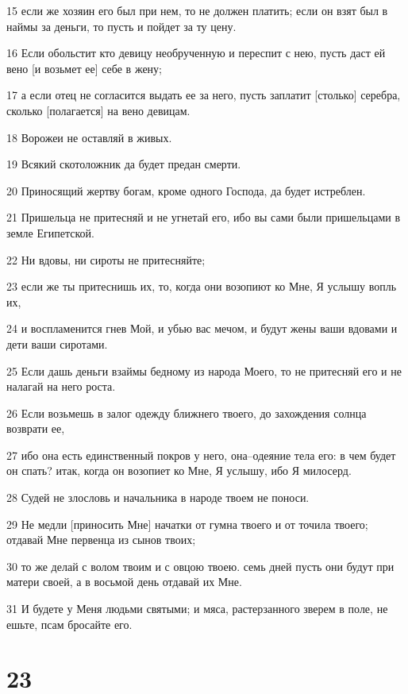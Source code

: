\par 15 если же хозяин его был при нем, то не должен платить; если он взят был в наймы за деньги, то пусть и пойдет за ту цену.
\par 16 Если обольстит кто девицу необрученную и переспит с нею, пусть даст ей вено [и возьмет ее] себе в жену;
\par 17 а если отец не согласится выдать ее за него, пусть заплатит [столько] серебра, сколько [полагается] на вено девицам.
\par 18 Ворожеи не оставляй в живых.
\par 19 Всякий скотоложник да будет предан смерти.
\par 20 Приносящий жертву богам, кроме одного Господа, да будет истреблен.
\par 21 Пришельца не притесняй и не угнетай его, ибо вы сами были пришельцами в земле Египетской.
\par 22 Ни вдовы, ни сироты не притесняйте;
\par 23 если же ты притеснишь их, то, когда они возопиют ко Мне, Я услышу вопль их,
\par 24 и воспламенится гнев Мой, и убью вас мечом, и будут жены ваши вдовами и дети ваши сиротами.
\par 25 Если дашь деньги взаймы бедному из народа Моего, то не притесняй его и не налагай на него роста.
\par 26 Если возьмешь в залог одежду ближнего твоего, до захождения солнца возврати ее,
\par 27 ибо она есть единственный покров у него, она--одеяние тела его: в чем будет он спать? итак, когда он возопиет ко Мне, Я услышу, ибо Я милосерд.
\par 28 Судей не злословь и начальника в народе твоем не поноси.
\par 29 Не медли [приносить Мне] начатки от гумна твоего и от точила твоего; отдавай Мне первенца из сынов твоих;
\par 30 то же делай с волом твоим и с овцою твоею. семь дней пусть они будут при матери своей, а в восьмой день отдавай их Мне.
\par 31 И будете у Меня людьми святыми; и мяса, растерзанного зверем в поле, не ешьте, псам бросайте его.

\chapter{23}

